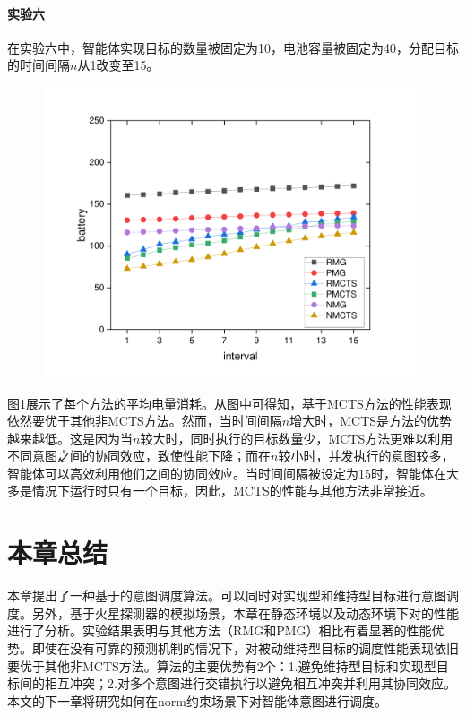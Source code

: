 \paragraph{实验六}
在实验六中，智能体实现目标的数量被固定为10，电池容量被固定为40，分配目标的时间间隔$n$从1改变至15。
\begin{figure}[h!]
\centering
\includegraphics[scale=0.4]{./figs/iX_cY_fixCap40G10}
\captionsetup{justification=centering}
\label{fig:dynamic3}
\end{figure}

图\ref{fig:dynamic3}展示了每个方法的平均电量消耗。从图中可得知，基于MCTS方法的性能表现依然要优于其他非MCTS方法。然而，当时间间隔$n$增大时，MCTS是方法的优势越来越低。这是因为当$n$较大时，同时执行的目标数量少，MCTS方法更难以利用不同意图之间的协同效应，致使性能下降；而在$n$较小时，并发执行的意图较多，智能体可以高效利用他们之间的协同效应。当时间间隔被设定为15时，智能体在大多是情况下运行时只有一个目标，因此，MCTS的性能与其他方法非常接近。
\section{本章总结}
本章提出了一种基于\SA 的意图调度算法\SAM 。\SAM 可以同时对实现型和维持型目标进行意图调度。另外，基于火星探测器的模拟场景，本章在静态环境以及动态环境下对\SAM 的性能进行了分析。实验结果表明\SAM 与其他方法（RMG和PMG）相比有着显著的性能优势。即使在没有可靠的预测机制的情况下，\SAM 对被动维持型目标的调度性能表现依旧要优于其他非MCTS方法。\SAM 算法的主要优势有2个：1.避免维持型目标和实现型目标间的相互冲突；2.对多个意图进行交错执行以避免相互冲突并利用其协同效应。
本文的下一章将研究如何在norm约束场景下对智能体意图进行调度。
